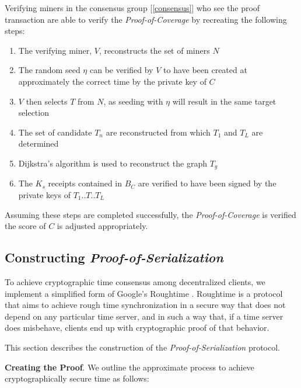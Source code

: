 \documentclass[10pt, nonatbib, nocopyrightspace, reprint]{sigplanconf}
\newcommand{\secref}[1]{[\autoref{#1}]}
\begin{document}
Verifying miners in the consensus group \secref{consensus} who see the proof transaction are able to verify the \emph{Proof-of-Coverage} by recreating the following steps:

\begin{enumerate}
        \item The verifying miner, $V$, reconstructs the set of miners $N$
        \item The random seed $\eta$ can be verified by $V$ to have been created at approximately the correct time by the private key of $C$
        \item $V$ then selects $T$ from $N$, as seeding with $\eta$ will result in the same target selection
        \item The set of candidate $T_n$ are reconstructed from which $T_1$ and $T_L$ are determined
        \item Dijkstra's algorithm is used to reconstruct the graph $T_g$
        \item The $K_s$ receipts contained in $B_C$ are verified to have been signed by the private keys of $T_1$..$T$..$T_L$
\end{enumerate}

Assuming these steps are completed successfully, the \emph{Proof-of-Coverage} is verified the score of $C$ is adjusted appropriately.

\subsection{Constructing \emph{Proof-of-Serialization}}

To achieve cryptographic time consensus among decentralized clients, we implement a simplified form of Google's Roughtime \cite{roughtime}. Roughtime is a protocol that aims to achieve rough time synchronization in a secure way that does not depend on any particular time server, and in such a way that, if a time server does misbehave, clients end up with cryptographic proof of that behavior.

This section describes the construction of the \emph{Proof-of-Serialization} protocol.

\textbf{Creating the Proof}. We outline the approximate process to achieve cryptographically secure time as follows:
\end{document}
